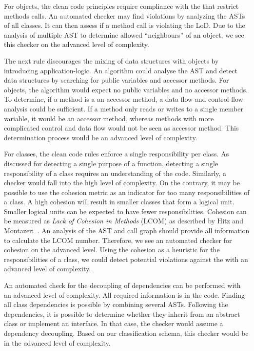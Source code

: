 For objects, the clean code principles require compliance with the  that restrict methods calls. An automated checker may find violations by analyzing the ASTs of all classes. It can then assess if a method call is violating the LoD. Due to the analysis of multiple AST to determine allowed \enquote{neighbours} of an object, we see this checker on the advanced level of complexity.

The next rule discourages the mixing of data structures with objects by introducing application-logic. An algorithm could analyse the AST and detect data structures by searching for public variables and accessor methods. For objects, the algorithm would expect no public variables and no accessor methods. To determine, if a method is a an accessor method, a data flow and control-flow analysis could be sufficient. If a method only reads or writes to a single member variable, it would be an accessor method, whereas methods with more complicated control and data flow would not be seen as accessor method. This determination process would be an advanced level of complexity.

For classes, the clean code rules enforce a single responsibility per class. As discussed for detecting a single purpose of a function, detecting a single responsibility of a class requires an understanding of the code. Similarly, a checker would fall into the high level of complexity. On the contrary, it may be possible to use the cohesion metric as an indicator for too many responsibilities of a class. A high cohesion will result in smaller classes that form a logical unit. Smaller logical units can be expected to have fewer responsibilities. Cohesion can be measured as \textit{Lack of Cohesion in Methods} (LCOM) as described by Hitz and Montazeri~\cite{Hitz95measuringcoupling}. An analysis of the AST and call graph should provide all information to calculate the LCOM number. Therefore, we see an automated checker for cohesion on the advanced level. Using the cohesion as a heuristic for the responsibilities of a class, we could detect potential violations against the  with an advanced level of complexity.

An automated check for the decoupling of dependencies can be performed with an advanced level of complexity. All required information is in the code. Finding all class dependencies is possible by combining several ASTs. Following the dependencies, it is possible to determine whether they inherit from an abstract class or implement an interface. In that case, the checker would assume a dependency decoupling. Based on our classification schema, this checker would be in the advanced level of complexity.


